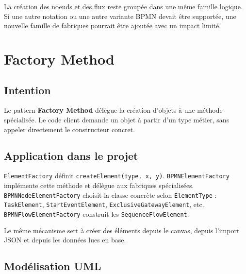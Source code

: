 \documentclass[12pt,a4paper]{article}
\begin{document}
La création des noeuds et des flux reste groupée dans une même famille logique. Si une autre notation ou une autre variante BPMN devait être supportée, une nouvelle famille de fabriques pourrait être ajoutée avec un impact limité.

\section{Factory Method}

\subsection{Intention}

Le pattern \textbf{Factory Method} délègue la création d'objets à une méthode spécialisée. Le code client demande un objet à partir d'un type métier, sans appeler directement le constructeur concret.

\subsection{Application dans le projet}

\texttt{ElementFactory} définit \texttt{createElement(type, x, y)}. \texttt{BPMNElementFactory} implémente cette méthode et délègue aux fabriques spécialisées. \texttt{BPMNNodeElementFactory} choisit la classe concrète selon \texttt{ElementType} : \texttt{TaskElement}, \texttt{StartEventElement}, \texttt{ExclusiveGatewayElement}, etc. \texttt{BPMNFlowElementFactory} construit les \texttt{SequenceFlowElement}.

Le même mécanisme sert à créer des éléments depuis le canvas, depuis l'import JSON et depuis les données lues en base.

\subsection{Modélisation UML}
\end{document}
